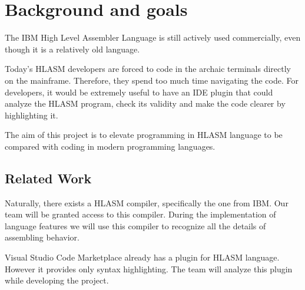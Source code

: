 \chapter{Background and goals}


The IBM High Level Assembler Language is still actively used commercially, even though it is a relatively old language. 

Today's HLASM developers are forced to code in the archaic terminals directly on the mainframe. Therefore, they spend too much time navigating the code. For developers, it would be extremely useful to have an IDE plugin that could analyze the HLASM program, check its validity and make the code clearer by highlighting it. 

The aim of this project is to elevate programming in HLASM language to be compared with coding in modern programming languages.

\section{Related Work}
Naturally, there exists a HLASM compiler, specifically the one from IBM. Our team will be granted access to this compiler. During the implementation of language features we will use this compiler to recognize all the details of assembling behavior. 

Visual Studio Code Marketplace already has a plugin for HLASM language. However it provides only syntax highlighting. The team will analyze this plugin while developing the project.